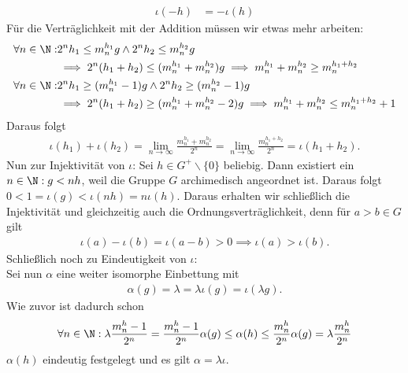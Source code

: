 \begin{solution}
\begin{align*}
  \iota(-h) &= -\iota(h)
\end{align*}
Für die Verträglichkeit mit der Addition müssen wir etwas mehr arbeiten:
\begin{align*}
  \forall n \in \N:& 2^nh_1 \leq m_n^{h_1}g \land 2^nh_2 \leq m_n^{h_2}g \\
  &\implies 2^n(h_1 + h_2) \leq (m_n^{h_1} + m_n^{h_2})g \implies m_n^{h_1} + m_n^{h_2} \geq m_n^{h_1 + h_2} \\
  \forall n \in \N:& 2^nh_1 \geq (m_n^{h_1}-1)g \land 2^nh_2 \geq (m_n^{h_2}-1)g \\
  &\implies 2^n(h_1 + h_2) \geq (m_n^{h_1} + m_n^{h_2} - 2)g \implies m_n^{h_1} + m_n^{h_2} \leq m_n^{h_1 + h_2} + 1
\end{align*}
Daraus folgt
\begin{align*}
  \iota(h_1) + \iota(h_2) = \lim_{n \rightarrow \infty} \frac{m_n^{h_1} + m_n^{h_2}}{2^n}
  = \lim_{n \rightarrow \infty} \frac{m_n^{h_1 + h_2}}{2^n} = \iota(h_1 + h_2).
\end{align*}
Nun zur Injektivität von $\iota$: Sei $h \in G^+\backslash\{0\}$ beliebig.
Dann existiert ein $n \in \N: g < nh$, weil die Gruppe $G$
archimedisch angeordnet ist. Daraus folgt $0 < 1 = \iota(g) < \iota(nh) = n\iota(h)$.
Daraus erhalten wir schließlich die Injektivität
und gleichzeitig auch die Ordnungsverträglichkeit, denn für $a > b \in G$ gilt
\begin{align*}
  \iota(a) - \iota(b) = \iota(a-b) > 0 \implies \iota(a) > \iota(b).
\end{align*}
Schließlich noch zu Eindeutigkeit von $\iota$: \\
Sei nun $\alpha$ eine weiter isomorphe Einbettung mit
\begin{align*}
  \alpha(g) = \lambda = \lambda \iota(g) = \iota(\lambda g).
\end{align*}
Wie zuvor ist dadurch schon
\begin{align*}
  \forall n \in \N: \lambda \frac{m_n^h - 1}{2^n} = \frac{m_n^h - 1}{2^n}\alpha(g) \leq \alpha(h) \leq \frac{m_n^h}{2^n}\alpha(g)
  = \lambda \frac{m_n^h}{2^n}
\end{align*}
$\alpha(h)$ eindeutig festgelegt und es gilt $\alpha = \lambda \iota$.
\end{solution}
